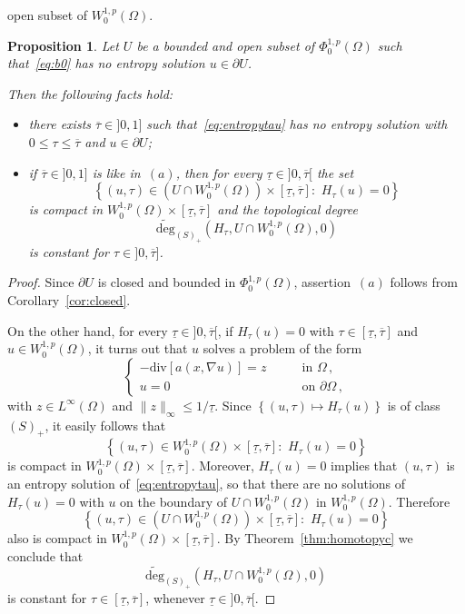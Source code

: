 \documentclass[twoside,reqno]{amsart}
\numberwithin{equation}{section}
\newtheorem{prop}[thm]{Proposition}
\theoremstyle{definition}
\begin{document}
open subset of $W^{1,p}_0(\Omega)$.
%
\begin{prop}
\label{prop:defndeg}
Let $U$ be a bounded and open subset of $\Phi^{1,p}_0(\Omega)$
such that~\eqref{eq:b0} has no entropy solution  
$u\in\partial U$.
\par
Then the following facts hold:
\begin{itemize}
\item[$(a)$]
there exists $\overline{\tau}\in]0,1]$ such 
that~\eqref{eq:entropytau} has no entropy solution 
with $0\leq \tau \leq\overline{\tau}$ and $u\in\partial U$;
\item[$(b)$]
if $\overline{\tau}\in]0,1]$ is like in~$(a)$, then
for every $\underline{\tau} \in]0,\overline{\tau}[$ the set
\[
\left\{(u,\tau)\in (U\cap W^{1,p}_0(\Omega))
\times [\underline{\tau},\overline{\tau}]:\,\,
H_{\tau}(u)=0\right\}
\]
is compact in $W^{1,p}_0(\Omega)\times
[\underline{\tau},\overline{\tau}]$ and the topological degree 
\[
\widetilde{\mathrm{deg}}_{(S)_+}(H_{\tau},U\cap W^{1,p}_0(\Omega),0)
\]
is constant for $\tau \in]0,\overline{\tau}]$.
\end{itemize}
\end{prop}
%
\begin{proof}
Since $\partial U$ is closed and bounded in 
$\Phi^{1,p}_0(\Omega)$, assertion~$(a)$ follows from
Corollary~\ref{cor:closed}.
\par
On the other hand, for every 
$\underline{\tau} \in]0,\overline{\tau}[$,
if $H_\tau(u)=0$ with $\tau\in [\underline{\tau},\overline{\tau}]$
and $u\in W^{1,p}_0(\Omega)$,
it turns out that $u$ solves a problem of the form
\[
\begin{cases}
- \mathrm{div}[a(x,\nabla u)] = z
&\qquad\text{in $\Omega$}\,,\\
u=0
&\qquad\text{on $\partial\Omega$}\,,
\end{cases}
\]
with $z\in L^\infty(\Omega)$ and 
$\|z\|_\infty \leq 1/\underline{\tau}$.
Since $\left\{(u,\tau)\mapsto H_\tau(u)\right\}$ is
of class~$(S)_+$, it easily follows that 
\[
\left\{(u,\tau)\in W^{1,p}_0(\Omega)\times
[\underline{\tau},\overline{\tau}]:\,\,H_\tau(u)=0\right\}
\]
is compact in $W^{1,p}_0(\Omega)\times
[\underline{\tau},\overline{\tau}]$.
Moreover, $H_\tau(u)=0$ implies that $(u,\tau)$ is an entropy 
solution of~\eqref{eq:entropytau}, so that there are no 
solutions of $H_\tau(u)=0$ with $u$ on the boundary of
$U\cap W^{1,p}_0(\Omega)$ in $W^{1,p}_0(\Omega)$. 
Therefore
\[
\left\{(u,\tau)\in (U\cap W^{1,p}_0(\Omega))\times
[\underline{\tau},\overline{\tau}]:\,\,H_\tau(u)=0\right\}
\]
also is compact in $W^{1,p}_0(\Omega)\times
[\underline{\tau},\overline{\tau}]$.
By Theorem~\ref{thm:homotopyc} we conclude that
\[
\widetilde{
\mathrm{deg}}_{(S)_+}(H_{\tau},U\cap W^{1,p}_0(\Omega),0)
\]
is constant for $\tau \in[\underline{\tau},\overline{\tau}]$,
whenever $\underline{\tau}\in]0,\overline{\tau}[$.
\end{proof}
\end{document}

